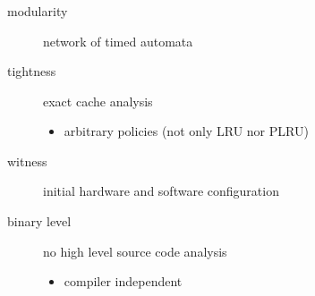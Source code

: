 \documentclass{beamer}
\begin{document}
  \begin{frame}
    \frametitle{\secname}
    \framesubtitle{\subsecname}
    
        \begin{description}
          \item[modularity] network of timed automata
          \item[tightness] exact cache analysis
            \begin{itemize} %
              \item arbitrary policies (not only LRU nor PLRU)
            \end{itemize}

          \vspace{1em}
          \item[witness] initial hardware and software configuration
          \item[binary level] no high level source code analysis
            \begin{itemize}
              \item compiler independent
            \end{itemize}            
        \end{description}
  \end{frame}
  
\end{document}
